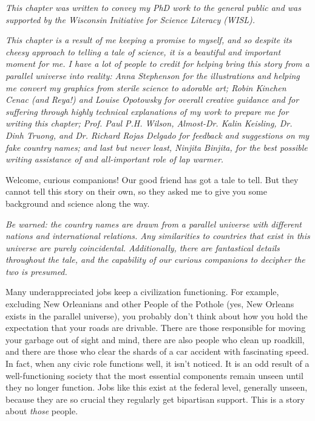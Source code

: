 {
\setlength{\parindent}{0pt}
\setlength{\parskip}{1em}

\begin{quoting}
  {
  \footnotesize
  \textit{This chapter was written to convey my PhD work to the general public
  and was supported by the Wisconsin Initiative for Science Literacy (WISL).}
  
  \textit{This chapter is a result of me keeping a promise to myself, and so
  despite its cheesy approach to telling a tale of science, it is a beautiful
  and important moment for me. I have a lot of people to credit for helping
  bring this story from a parallel universe into reality: Anna Stephenson for
  the illustrations and helping me convert my graphics from sterile science to
  adorable art; Robin Kinchen Cenac (and Reya!) and Louise Opotowsky for
  overall creative guidance and for suffering through highly technical
  explanations of my work to prepare me for writing this chapter; Prof. Paul
  P.H. Wilson, Almost-Dr.  Kalin Keisling, Dr. Dinh Truong, and Dr. Richard
  Rojas Delgado for feedback and suggestions on my fake country names; and last
  but never least, Ninjita Binjita, for the best possible writing assistance of
  and all-important role of lap warmer.} 
 
  }
\end{quoting}

\narr Welcome, curious companions! Our good friend has got a tale to tell.  But
they cannot tell this story on their own, so they asked me to give you some
background and science along the way.

\textit{Be warned: the country names are drawn from a parallel universe with
different nations and international relations. Any similarities to countries
that exist in this universe are purely coincidental. Additionally, there are
fantastical details throughout the tale, and the capability of our curious
companions to decipher the two is presumed.}

Many underappreciated jobs keep a civilization functioning. For example,
excluding New Orleanians and other People of the Pothole (yes, New Orleans
exists in the parallel universe), you probably don't think about how you hold
the expectation that your roads are drivable. There are those responsible for
moving your garbage out of sight and mind, there are also people who clean up
roadkill, and there are those who clear the shards of a car accident with
fascinating speed. In fact, when any civic role functions well, it isn't
noticed. It is an odd result of a well-functioning society that the most
essential components remain unseen until they no longer function. Jobs like
this exist at the federal level, generally unseen, because they are so crucial
they regularly get bipartisan support. This is a story about \textit{those}
people.

}
